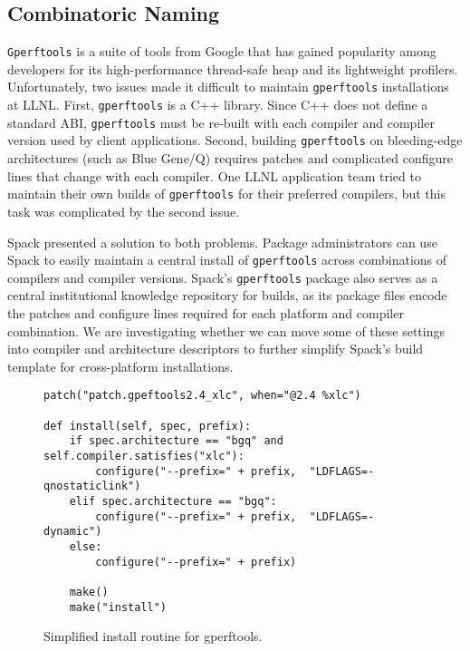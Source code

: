 
\subsection{Combinatoric Naming}
\label{sec:usecase-combinatoric}

{\tt Gperftools} is a suite of tools from Google that has gained popularity among
developers for its high-performance thread-safe heap and its lightweight profilers.
Unfortunately, two issues made it difficult to maintain {\tt gperftools} installations
at LLNL.  First, {\tt gperftools} is a C++ library.  Since C++ does not define a standard
ABI, {\tt gperftools} must be re-built with each compiler and compiler version used by client
applications.  Second, building {\tt gperftools} on bleeding-edge architectures
(such as Blue Gene/Q) requires patches and complicated configure lines that
change with each compiler.  One LLNL application team tried to maintain their own
builds of {\tt gperftools} for their preferred compilers, but this
task was complicated by the second issue.

Spack presented a solution to both problems.  Package administrators can use Spack to
easily maintain a central install of {\tt gperftools} across combinations of
compilers and compiler versions.  Spack's {\tt gperftools} package also serves as a central
institutional knowledge repository for builds, as its package files encode
the patches and configure lines required for each platform and compiler combination.
We are investigating whether we can move some of these settings into compiler and
architecture descriptors to further simplify Spack's build template for cross-platform
installations.
\begin{figure}
\begin{verbatim}
patch("patch.gpeftools2.4_xlc", when="@2.4 %xlc")

def install(self, spec, prefix):
    if spec.architecture == "bgq" and self.compiler.satisfies("xlc"):
        configure("--prefix=" + prefix,  "LDFLAGS=-qnostaticlink")
    elif spec.architecture == "bgq":
        configure("--prefix=" + prefix,  "LDFLAGS=-dynamic")
    else:
        configure("--prefix=" + prefix)

    make()
    make("install")
\end{verbatim}
  \caption{
    Simplified install routine for gperftools.
    \label{fig:gperftools}
  }
\end{figure}

